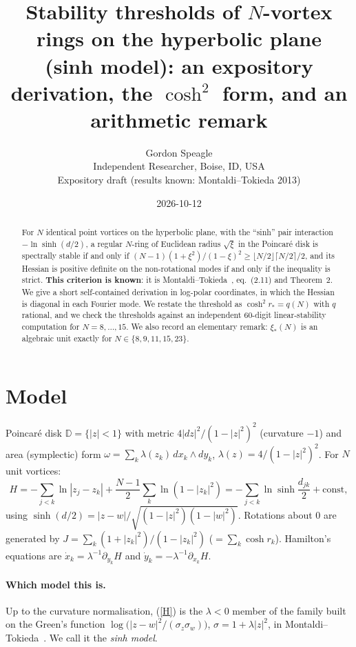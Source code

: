 \documentclass[11pt]{article}
\title{Stability thresholds of $N$-vortex rings on the hyperbolic plane\\
(sinh model): an expository derivation, the $\cosh^2$ form, and an arithmetic remark}
\author{Gordon Speagle\\Independent Researcher, Boise, ID, USA\\[2pt]\small Expository draft (results known: Montaldi--Tokieda 2013)}
\date{2026-10-12}
\theoremstyle{remark}
\begin{document}
\maketitle

\begin{abstract}
For $N$ identical point vortices on the hyperbolic plane, with the ``sinh'' pair interaction
$-\ln\sinh(d/2)$, a regular $N$-ring of Euclidean radius $\sqrt\xi$ in the Poincar\'e disk is spectrally
stable if and only if $(N-1)(1+\xi^2)/(1-\xi)^2 \ge \lfloor N/2\rfloor\lceil N/2\rceil/2$, and its Hessian is
positive definite on the non-rotational modes if and only if the inequality is strict.
\textbf{This criterion is known}: it is Montaldi--Tokieda~\cite{MT}, eq.~(2.11) and Theorem~2. We give a short self-contained derivation in
log-polar coordinates, in which the Hessian is diagonal in each Fourier mode. We restate the threshold as
$\cosh^2 r_*=q(N)$ with $q$ rational, and we check the thresholds against an independent 60-digit
linear-stability computation for $N=8,\dots,15$. We also record an elementary remark: $\xi_*(N)$ is an
algebraic unit exactly for $N\in\{8,9,11,15,23\}$.
\end{abstract}

\section{Model}
Poincar\'e disk $\mathbb D=\{|z|<1\}$ with metric $4|dz|^2/(1-|z|^2)^2$ (curvature $-1$) and area
(symplectic) form $\omega=\sum_k \lambda(z_k)\,dx_k\wedge dy_k$, $\lambda(z)=4/(1-|z|^2)^2$. For $N$ unit
vortices:
\begin{equation}\label{H}
H=-\sum_{j<k}\ln|z_j-z_k|+\frac{N-1}{2}\sum_k\ln(1-|z_k|^2)
=-\sum_{j<k}\ln\sinh\frac{d_{jk}}{2}+\text{const},
\end{equation}
using $\sinh(d/2)=|z-w|/\sqrt{(1-|z|^2)(1-|w|^2)}$. Rotations about $0$ are generated by
$J=\sum_k(1+|z_k|^2)/(1-|z_k|^2)$ ($=\sum_k\cosh r_k$). Hamilton's equations are $\dot x_k=\lambda^{-1}\partial_{y_k}H$ and
$\dot y_k=-\lambda^{-1}\partial_{x_k}H$.

\paragraph{Which model this is.} Up to the curvature normalisation, (\ref{H}) is the $\lambda<0$ member of
the family built on the Green's function $\log\big(|z-w|^2/(\sigma_z\sigma_w)\big)$, $\sigma=1+\lambda|z|^2$,
in Montaldi--Tokieda~\cite[(1.12)]{MT}. We call it the \emph{sinh model}.
\end{document}
